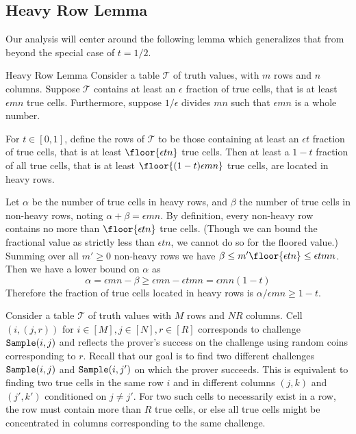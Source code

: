 \subsection{Heavy Row Lemma}

Our analysis will center around the following lemma which generalizes that from \cite{Dam10} beyond the special case of $t=1/2$.

\begin{lemma}{Heavy Row Lemma}
    Consider a table $\mathcal{T}$ of truth values, with $m$ rows and $n$ columns.
    Suppose $\mathcal{T}$ contains at least an $\epsilon$ fraction of true cells, that is at least $\epsilon mn$ true cells.
    Furthermore, suppose $1/\epsilon$ divides $mn$ such that $\epsilon mn$ is a whole number.

    For $t\in[0,1]$, define the  rows of $\mathcal{T}$ to be those containing at least an $\epsilon t$ fraction of true cells, that is at least $\floor{\epsilon tn}$ true cells.
    Then at least a $1-t$ fraction of all true cells, that is at least $\floor{(1-t)\epsilon mn}$ true cells, are located in heavy rows. 

    \proof
    Let $\alpha$ be the number of true cells in heavy rows, and $\beta$ the number of true cells in non-heavy rows, noting $\alpha+\beta=\epsilon mn$.
    By definition, every non-heavy row contains no more than $\floor{\epsilon tn}$ true cells. (Though we can bound the fractional value as strictly less than $\epsilon tn$, we cannot do so for the floored value.)
    Summing over all $m'\geq 0$ non-heavy rows we have $\beta \leq m'\floor{\epsilon tn} \leq \epsilon tmn$.
    Then we have a lower bound on $\alpha$ as
    \begin{equation}
        \alpha = \epsilon mn - \beta \geq \epsilon mn - \epsilon tmn = \epsilon mn(1-t)
    \end{equation}
    Therefore the fraction of true cells located in heavy rows is $\alpha/\epsilon mn \geq 1-t$.
\end{lemma}

Consider a table $\mathcal{T}$ of truth values with $M$ rows and $NR$ columns.
Cell $(i,(j,r))$ for $i\in[M], j\in[N], r\in[R]$ corresponds to challenge $\mathtt{Sample}(i,j)$ and reflects the prover's success on the challenge using random coins corresponding to $r$.
Recall that our goal is to find two different challenges $\mathtt{Sample}(i,j)$ and $\mathtt{Sample}(i,j')$ on which the prover succeeds.
This is equivalent to finding two true cells in the same row $i$ and in different columns $(j,k)$ and $(j',k')$ conditioned on $j\neq j'$.
For two such cells to necessarily exist in a row, the row must contain more than $R$ true cells, or else all true cells might be concentrated in columns corresponding to the same challenge.

